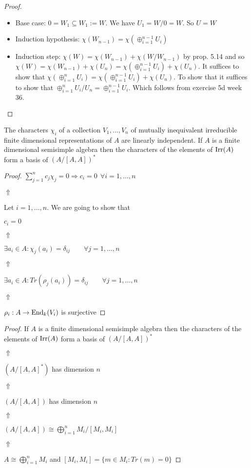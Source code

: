 \begin{proof}

\begin{itemize}
  \item Base case: \(0=W_{1}\subseteq W_{1}:=W.\) We have \(U_{1}=W/0=W.\) So \(U=W\)
  \item Induction hypothesis: \(\chi (W_{n-1})=\chi (\oplus _{i=1}^{n-1} U_{i})\)
  \item Induction step: \(\chi (W)=\chi (W_{n-1})+\chi (W/W_{n-1})\) by prop. 5.14 and so \(\chi (W)=\chi (W_{n-1})+\chi (U_{n})=\chi (\oplus _{i=1}^{n-1} U_{i})+\chi (U_{n})\). It suffices to show that \(\chi (\oplus _{i=1}^n U_{i}) =\chi (\oplus _{i=1}^{n-1} U_{i})+\chi (U_{n})\). To show that it suffices to show that \(\oplus _{i=1}^n U_{i}/U_{n}=\oplus _{i=1}^{n-1} U_{i}\). Which follows from exercise 5d week 36.
\end{itemize}

\end{proof}

\begin{thm}
The characters \(\chi _{i}\) of a collection \(V_{1},\ldots ,V_{n}\) of mutually inequivalent irreducible finite dimensional representations of \(A\) are linearly independent. If \(A\) is a finite dimensional semisimple algebra then the characters of the elements of \(\operatorname{Irr}(A)\) form a basis of \((A/[A,A])^*\)
\end{thm}

\begin{proof}
\(\sum _{j=1}^n c_{j}\chi _{j}=0 \Longrightarrow c_{i}=0\  \  \forall i=1,\ldots ,n\)

\(\Uparrow \)

Let \(i=1,\ldots ,n.\) We are going to show that

\(c_{i}=0\)

\(\Uparrow \)

\(\exists a_{i}\in A:\chi _{j}(a_{i})=\delta _{ij} \qquad \forall j=1,\ldots ,n\)

\(\Uparrow \)

\(\exists a_{i}\in A:Tr(\rho _{j}(a_{i}))=\delta _{ij} \qquad \forall j=1,\ldots ,n\)

\(\Uparrow \)

\(\rho _{i} : A\rightarrow \operatorname{End}_{k}(V_{i})\) is surjective
\end{proof}

\begin{proof}
If \(A\) is a finite dimensional semisimple algebra then the characters of the elements of \(\operatorname{Irr}(A)\) form a basis of \((A/[A,A])^*\)

\(\Uparrow \)

\((A/[A,A]^*)\) has dimension \(n\)

\(\Uparrow \)

\((A/[A,A])\) has dimension \(n\)

\(\Uparrow \)

\((A/[A,A]) \cong  \bigoplus_{i=1}^n M_{i}/[M_{i},M_{i}]\)

\(\Uparrow \)

\(A\cong \bigoplus_{i=1}^n M_{i}\) and \([M_{i},M_{i}]=\{m\in M_{i} : Tr(m)=0\}\)
\end{proof}

